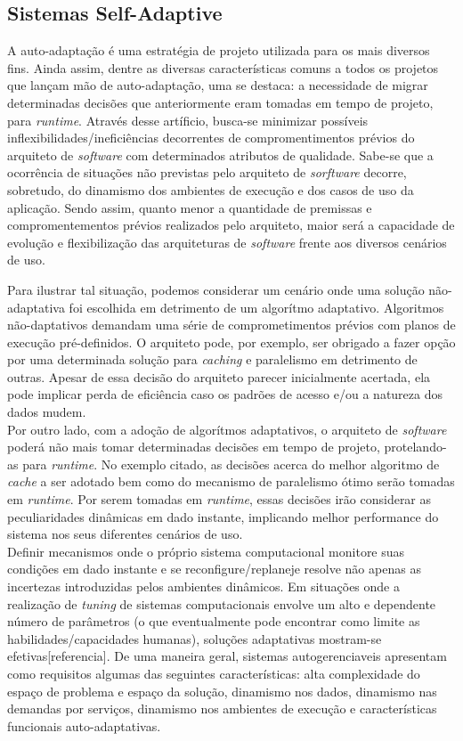 \documentclass[conference]{IEEEtran}
\begin{document}
\subsection{Sistemas Self-Adaptive}

A auto-adaptação é uma estratégia de projeto utilizada para os mais diversos fins. Ainda assim, dentre as diversas características comuns a todos os projetos que lançam mão de auto-adaptação, uma se destaca: a necessidade de migrar determinadas decisões que anteriormente eram tomadas em tempo de projeto, para \textit{runtime}. Através desse artíficio, busca-se minimizar possíveis inflexibilidades/ineficiências decorrentes de compromentimentos prévios do arquiteto de \textit{software} com determinados atributos de qualidade. Sabe-se que a ocorrência de situações não previstas pelo arquiteto de \textit{sorftware} decorre, sobretudo, do dinamismo dos ambientes de execução e dos casos de uso da aplicação. Sendo assim, quanto menor a quantidade de premissas e compromentementos prévios realizados pelo arquiteto, maior será a capacidade de evolução e flexibilização das arquiteturas de \textit{software} frente aos diversos cenários de uso.

Para ilustrar tal situação, podemos considerar um cenário onde uma solução não-adaptativa foi escolhida em detrimento de um algorítmo adaptativo. Algoritmos não-daptativos demandam uma série de comprometimentos prévios com planos de execução pré-definidos. O arquiteto pode, por exemplo, ser obrigado a fazer opção por uma determinada solução para \textit{caching} e paralelismo em detrimento de outras. Apesar de essa decisão do arquiteto parecer inicialmente acertada, ela pode implicar perda de eficiência caso os padrões de acesso e/ou a natureza dos dados mudem.\\
Por outro lado, com a adoção de algorítmos adaptativos, o arquiteto de \textit{software} poderá não mais tomar determinadas decisões em tempo de projeto, protelando-as para \textit{runtime}. No exemplo citado, as decisões acerca do melhor algoritmo de \textit{cache} a ser adotado bem como do mecanismo de paralelismo ótimo serão tomadas em \textit{runtime}. Por serem tomadas em \textit{runtime}, essas decisões irão considerar as peculiaridades dinâmicas em dado instante, implicando melhor performance do sistema nos seus diferentes cenários de uso.\\
Definir mecanismos onde o próprio sistema computacional monitore suas condições em dado instante e se reconfigure/replaneje resolve não apenas as incertezas introduzidas pelos ambientes dinâmicos. Em situações onde a realização de \textit{tuning} de sistemas computacionais envolve um alto e dependente número de parâmetros (o que eventualmente pode encontrar como limite as habilidades/capacidades humanas), soluções adaptativas mostram-se efetivas[referencia]. De uma maneira geral, sistemas autogerenciaveis apresentam como requisitos algumas das seguintes características: alta complexidade do espaço de problema e espaço da solução, dinamismo nos dados, dinamismo nas demandas por serviços, dinamismo nos ambientes de execução e características funcionais auto-adaptativas.
\end{document}
